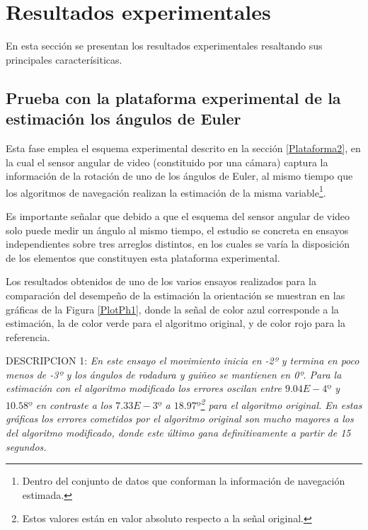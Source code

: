 \documentclass[conference]{IEEEtran}
\begin{document}
\section{Resultados experimentales}
En esta sección se presentan los resultados experimentales resaltando sus principales caracterísiticas.
\subsection{Prueba con la plataforma experimental de la estimación los ángulos de Euler}
Esta fase emplea el esquema experimental descrito en la sección \ref{Plataforma2}, en la cual el sensor angular de video (constituido por una cámara) captura la información de la rotación de uno de los ángulos de Euler, al mismo tiempo que los algoritmos de navegación realizan la estimación de la misma variable\footnote{Dentro del conjunto de datos que conforman la información de navegación estimada.}.\par
Es importante señalar que debido a que el esquema del sensor angular de video solo puede medir un ángulo al mismo tiempo, el estudio se concreta en ensayos independientes sobre tres arreglos distintos, en los cuales se varía la disposición de los elementos que constituyen esta plataforma experimental.\par
Los resultados obtenidos de uno de los varios ensayos realizados para la comparación del desempeño de la estimación la orientación se muestran en las gráficas de la Figura \ref{PlotPh1}, donde la señal de color azul corresponde a la estimación, la de color verde para el  algoritmo original, y de color rojo para la referencia.\par
DESCRIPCION 1: \textsl{En este ensayo el movimiento inicia en -2º y termina en poco menos de -3º y los ángulos de rodadura y guiñeo se mantienen en 0º. Para la estimación con el algoritmo modificado los errores oscilan entre $9.04E-4º$ y $10.58º$ en contraste a los $7.33E-3º$ a $18.97º$\footnote{Estos valores están en valor absoluto respecto a la señal original.} para el algoritmo original. 
En estas gráficas los errores cometidos por el algoritmo original son mucho mayores a los del algoritmo modificado, donde este último gana definitivamente a partir de 15 segundos.}\par
\end{document}
